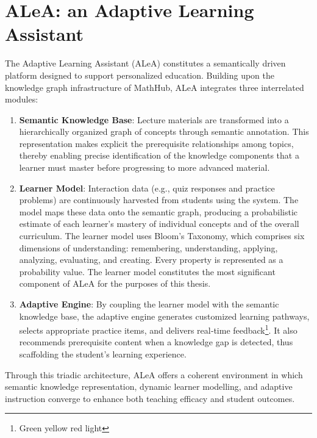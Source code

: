 \section{ALeA: an Adaptive Learning Assistant}
The Adaptive Learning Assistant (ALeA)\cite{ALeA:online} constitutes a semantically driven platform
designed to support personalized education.  Building upon the knowledge graph
infrastructure of MathHub, ALeA integrates three
interrelated modules:
\begin{enumerate}
      \item \textbf{Semantic Knowledge Base}:  Lecture materials are transformed
            into a hierarchically organized graph of concepts through semantic
            annotation.  This representation makes explicit the prerequisite
            relationships among topics, thereby enabling precise identification of
            the knowledge components that a learner must master before progressing
            to more advanced material.
      \item \textbf{Learner Model}:   Interaction data (e.g., quiz responses and practice problems) are continuously harvested from
            students using the system.  The model maps these data onto the semantic
            graph, producing a probabilistic estimate of each learner’s mastery of
            individual concepts and of the overall curriculum. 
            The learner model uses Bloom's Taxonomy, which comprises six dimensions of understanding:
            remembering, understanding, applying, analyzing, evaluating, and creating.
            Every property is represented as a probability value.
            The learner model constitutes the most significant component of ALeA for the purposes of this thesis.
      \item \textbf{Adaptive Engine}:  By coupling the learner model with the
            semantic knowledge base, the adaptive engine generates customized
            learning pathways, selects appropriate practice items, and delivers
            real‑time feedback\footnote{Green yellow red light}.  It also recommends prerequisite content when a
            knowledge gap is detected, thus scaffolding the student’s learning
            experience.
\end{enumerate}
Through this triadic architecture, ALeA offers a coherent environment in which
semantic knowledge representation, dynamic learner modelling, and adaptive
instruction converge to enhance both teaching efficacy and student outcomes.

